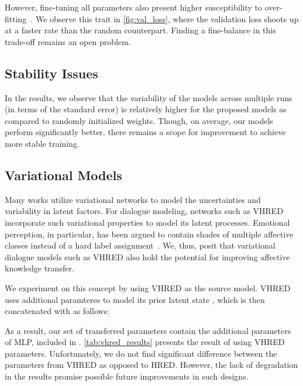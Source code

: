 \documentclass[preprint,3pt]{elsarticle}
\begin{document}
However, fine-tuning all parameters also present higher susceptibility to over-fitting~\cite{howard2018universal}. We observe this trait in \cref{fig:val_loss}, where the validation loss shoots up at a faster rate than the random counterpart. Finding a fine-balance in this trade-off remains an open problem.

\subsection{Stability Issues}

In the results, we observe that the variability of the models across multiple runs (in terms of the standard error) is relatively higher for the proposed models as compared to randomly initialized weights. Though, on average, our models perform significantly better, there remains a scope for improvement to achieve more stable training.

\subsection{Variational Models} 

Many works utilize variational networks to model the uncertainties and variability in latent factors. For dialogue modeling, networks such as VHRED~\cite{SerbanSLCPCB17} incorporate such variational properties to model its latent processes. Emotional perception, in particular, has been argued to contain shades of multiple affective classes instead of a hard label assignment~\cite{DBLP:journals/taslp/MowerMN11}. We, thus, posit that variational dialogue models such as VHRED also hold the potential for improving affective knowledge transfer. 

We experiment on this concept by using VHRED as the source model. VHRED uses additional paramteres to model its prior latent state , which is then concatenated with  as follows:



As a result, our set of transferred parameters contain the additional parameters of MLP, included in . \cref{tab:vhred_results} presents the result of using VHRED parameters. Unfortunately, we do not find significant difference between the parameters from VHRED as opposed to HRED. However, the lack of degradation in the results promise possible future improvements in such designs.
\end{document}
